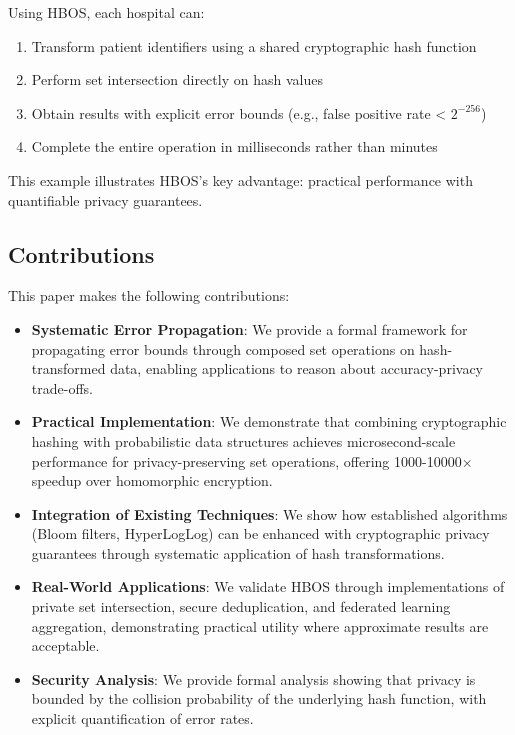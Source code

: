 \documentclass[10pt,conference]{IEEEtran}
\begin{document}
Using HBOS, each hospital can:
\begin{enumerate}
\item Transform patient identifiers using a shared cryptographic hash function
\item Perform set intersection directly on hash values
\item Obtain results with explicit error bounds (e.g., false positive rate < $2^{-256}$)
\item Complete the entire operation in milliseconds rather than minutes
\end{enumerate}

This example illustrates HBOS's key advantage: practical performance with quantifiable privacy guarantees.

\subsection{Contributions}

This paper makes the following contributions:

\begin{itemize}
\item \textbf{Systematic Error Propagation}: We provide a formal framework for propagating error bounds through composed set operations on hash-transformed data, enabling applications to reason about accuracy-privacy trade-offs.

\item \textbf{Practical Implementation}: We demonstrate that combining cryptographic hashing with probabilistic data structures achieves microsecond-scale performance for privacy-preserving set operations, offering 1000-10000× speedup over homomorphic encryption.

\item \textbf{Integration of Existing Techniques}: We show how established algorithms (Bloom filters, HyperLogLog) can be enhanced with cryptographic privacy guarantees through systematic application of hash transformations.

\item \textbf{Real-World Applications}: We validate HBOS through implementations of private set intersection, secure deduplication, and federated learning aggregation, demonstrating practical utility where approximate results are acceptable.

\item \textbf{Security Analysis}: We provide formal analysis showing that privacy is bounded by the collision probability of the underlying hash function, with explicit quantification of error rates.
\end{itemize}
\end{document}
